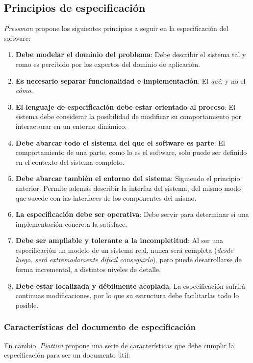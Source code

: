 \subsection{Principios de especificación}

\textit{Pressman} propone los siguientes principios a seguir en la especificación del software:

\begin{enumerate}
    \item \textbf{Debe modelar el dominio del problema}: Debe describir el sistema tal y como es percibido por los expertos del dominio de aplicación.
    \item \textbf{Es necesario separar funcionalidad e implementación}: El \textit{qué}, y no el \textit{cómo}.
    \item \textbf{El lenguaje de especificación debe estar orientado al proceso}: El sistema debe considerar la posibilidad de modificar su comportamiento por interacturar en un entorno dinámico.
    \item \textbf{Debe abarcar todo el sistema del que el software es parte}: El comportamiento de una parte, como lo es el software, solo puede ser definido en el contexto del sistema completo.
    \item \textbf{Debe abarcar también el entorno del sistema}: Siguiendo el principio anterior. Permite además describir la interfaz del sistema, del mismo modo que sucede con las interfaces de los componentes del mismo.
    \item \textbf{La especificación debe ser operativa}: Debe servir para determinar si una implementación concreta la satisface.
    \item \textbf{Debe ser ampliable y tolerante a la incompletitud}: Al ser una especificación un modelo de un sistema real, nunca será completa (\textit{desde luego, será extremadamente difícil conseguirlo}), pero puede desarrollarse de forma incremental, a distintos niveles de detalle.
    \item \textbf{Debe estar localizada y débilmente acoplada}: La especificación sufrirá continuas modificaciones, por lo que su estructura debe facilitarlas todo lo posible. 
\end{enumerate}

\subsubsection{Características del documento de especificación}

En cambio, \textit{Piattini} propone una serie de características que debe cumplir la especificación para ser un documento útil:

